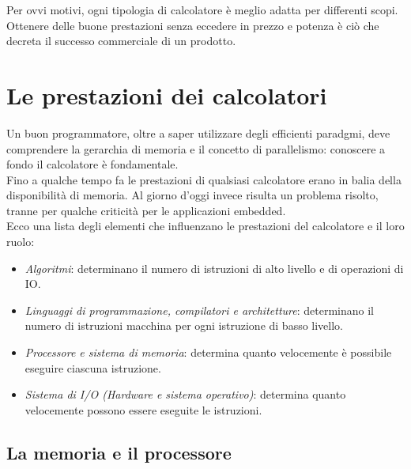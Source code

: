 \documentclass[class=book, crop=false]{standalone}
\begin{document}
Per ovvi motivi, ogni tipologia di calcolatore è meglio adatta per differenti scopi. Ottenere delle buone prestazioni senza eccedere in prezzo e potenza è ciò che decreta il successo commerciale di un prodotto.

\section{Le prestazioni dei calcolatori}
Un buon programmatore, oltre a saper utilizzare degli efficienti paradgmi, deve comprendere la gerarchia di memoria e il concetto di parallelismo: conoscere a fondo il calcolatore è fondamentale.\\
Fino a qualche tempo fa le prestazioni di qualsiasi calcolatore erano in balia della disponibilità di memoria. Al giorno d'oggi invece risulta un problema risolto, tranne per qualche criticità per le applicazioni embedded.\\
Ecco una lista degli elementi che influenzano le prestazioni del calcolatore e il loro ruolo:
\begin{itemize}[noitemsep, nolistsep]
	\item \emph{Algoritmi}: determinano il numero di istruzioni di alto livello e di operazioni di IO.
	\item \emph{Linguaggi di programmazione, compilatori e architetture}: determinano il numero di istruzioni macchina per ogni istruzione di basso livello.
	\item \emph{Processore e sistema di memoria}: determina quanto velocemente è possibile eseguire ciascuna istruzione.
	\item \emph{Sistema di I/O (Hardware e sistema operativo)}: determina quanto velocemente possono essere eseguite le istruzioni.
\end{itemize}

\subsection{La memoria e il processore}
\end{document}

